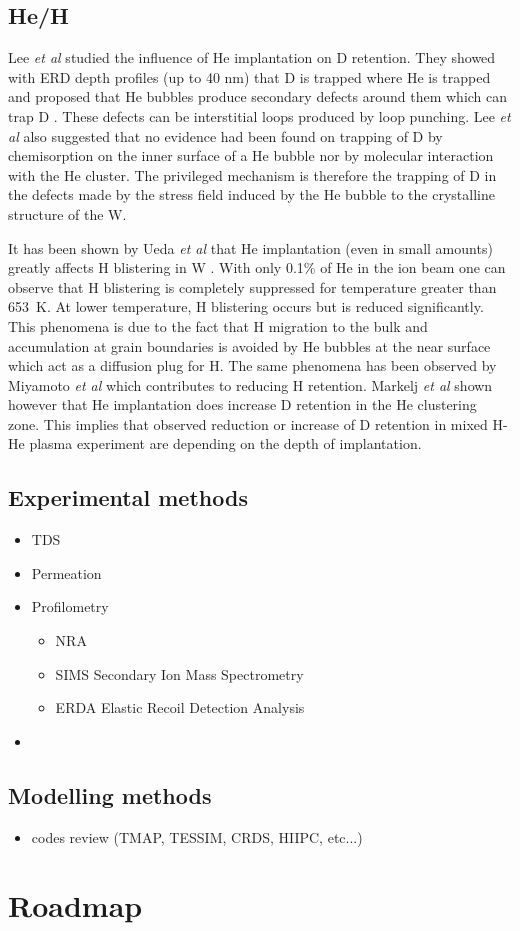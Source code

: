 \subsection{He/H}
Lee \textit{et al} studied the influence of He implantation on D retention.
They showed with ERD depth profiles (up to 40 nm) that D is trapped where He is trapped and proposed that He bubbles produce secondary defects around them which can trap D \cite{lee_hydrogen_2007}.
These defects can be interstitial loops produced by loop punching.
Lee \textit{et al} also suggested that no evidence had been found on trapping of D by chemisorption on the inner surface of a He bubble nor by molecular interaction with the He cluster.
The privileged mechanism is therefore the trapping of D in the defects made by the stress field induced by the He bubble to the crystalline structure of the W.

It has been shown by Ueda \textit{et al} that He implantation (even in small amounts) greatly affects H blistering in W \cite{ueda_simultaneous_2009}.
With only 0.1\% of He in the ion beam one can observe that H blistering is completely suppressed for temperature greater than \SI{653}{K}.
At lower temperature, H blistering occurs but is reduced significantly.
This phenomena is due to the fact that H migration to the bulk and accumulation at grain boundaries is avoided by He bubbles at the near surface which act as a diffusion plug for H.
The same phenomena has been observed by Miyamoto \textit{et al} \cite{miyamoto_microscopic_2011} which contributes to reducing H retention.
Markelj \textit{et al} \cite{markelj_hydrogen_2017} shown however that He implantation does increase D retention in the He clustering zone.
This implies that observed reduction or increase of D retention in mixed H-He plasma experiment are depending on the depth of implantation.

\subsection{Experimental methods}
\begin{itemize}
    \item TDS
    \item Permeation
    \item Profilometry
    \begin{itemize}
        \item NRA
        \item SIMS Secondary Ion Mass Spectrometry
        \item ERDA Elastic Recoil Detection Analysis
    \end{itemize}
    \item 
\end{itemize}
\subsection{Modelling methods}
\begin{itemize}
    \item codes review (TMAP, TESSIM, CRDS, HIIPC, etc...)
\end{itemize}
\section{Roadmap}




